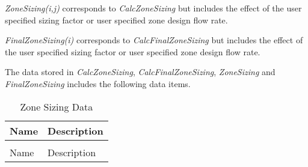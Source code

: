 \emph{ZoneSizing(i,j)} corresponds to \emph{CalcZoneSizing} but includes the effect of the user specified sizing factor or user specified zone design flow rate.

\emph{FinalZoneSizing(i)} corresponds to \emph{CalcFinalZoneSizing} but includes the effect of the user specified sizing factor or user specified zone design flow rate.

The data stored in \emph{CalcZoneSizing}, \emph{CalcFinalZoneSizing}, \emph{ZoneSizing} and \emph{FinalZoneSizing} includes the following data items.

\begin{longtable}[c]{p{1.85in}p{4.13in}}
\caption{Zone Sizing Data \label{table:zone-sizing-data}} \tabularnewline
\toprule 
Name & Description \tabularnewline \midrule
\endfirsthead

\caption[]{Zone Sizing Data} \tabularnewline
\toprule 
Name & Description \tabularnewline \midrule
\endhead


\end{longtable}

